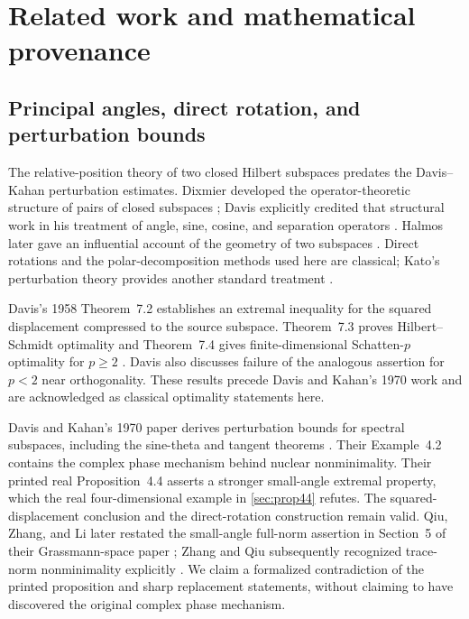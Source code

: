 \documentclass[11pt]{article}
\begin{document}
\section{Related work and mathematical provenance}
\label{sec:related}

\subsection{Principal angles, direct rotation, and perturbation bounds}
\label{sec:related-classical}

The relative-position theory of two closed Hilbert subspaces predates
the Davis--Kahan perturbation estimates.  Dixmier developed the
operator-theoretic structure of pairs of closed subspaces
\citep{dixmier1948position}; Davis explicitly credited that structural
work in his treatment of angle, sine, cosine, and separation operators
\citep[Introduction]{davis1958separation}.  Halmos later gave an
influential account of the geometry of two subspaces
\citep{halmos1969two}.  Direct rotations and the polar-decomposition
methods used here are classical; Kato's perturbation theory provides
another standard treatment \citep{kato1966perturbation,kato1976perturbation}.

Davis's 1958 Theorem~7.2 establishes an extremal inequality for the
squared displacement compressed to the source subspace.
Theorem~7.3 proves Hilbert--Schmidt optimality and Theorem~7.4 gives
finite-dimensional Schatten-$p$ optimality for $p\ge2$
\citep{davis1958separation}.  Davis also discusses failure of the
analogous assertion for $p<2$ near orthogonality.  These results
precede Davis and Kahan's 1970 work and are acknowledged as classical
optimality statements here.

Davis and Kahan's 1970 paper derives perturbation bounds for spectral
subspaces, including the sine-theta and tangent theorems
\citep{davis1970rotation}.  Their Example~4.2 contains the complex
phase mechanism behind nuclear nonminimality.  Their printed real
Proposition~4.4 asserts a stronger small-angle extremal property,
which the real four-dimensional example in \cref{sec:prop44} refutes.
The squared-displacement conclusion and the direct-rotation
construction remain valid.  Qiu, Zhang, and Li later restated the
small-angle full-norm assertion in Section~5 of their Grassmann-space
paper \citep{qiu2006grassmann}; Zhang and Qiu subsequently recognized
trace-norm nonminimality explicitly
\citep{zhang2010canonicalangles}.  We claim a formalized contradiction
of the printed proposition and sharp replacement statements, without
claiming to have discovered the original complex phase mechanism.
\end{document}
